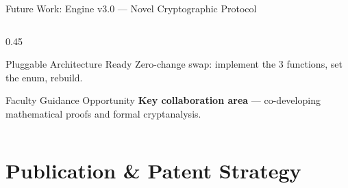 \documentclass[aspectratio=169, 11pt]{beamer}
\begin{document}
\begin{frame}{Future Work: Engine v3.0 — Novel Cryptographic Protocol}
\begin{columns}[T]
\begin{column}{0.45\textwidth}
\begin{block}{Pluggable Architecture Ready}
        \scriptsize Zero-change swap: implement the 3 functions, set the enum, rebuild.
      \end{block}
      \vspace{0.2em}
      \begin{exampleblock}{Faculty Guidance Opportunity}
        \small
        \textbf{Key collaboration area} — co-developing mathematical proofs and formal cryptanalysis.
      \end{exampleblock}
    \end{column}
  \end{columns}
\end{frame}

\section{Publication \& Patent Strategy}
\end{document}
